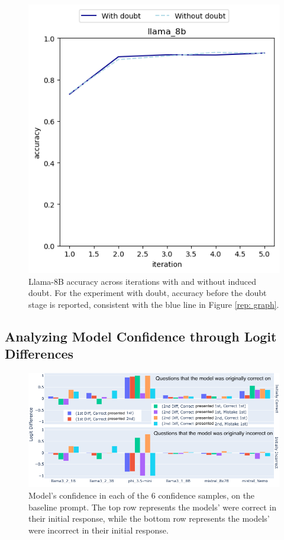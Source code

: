 \begin{figure}[ht!]
  \centering
  \includegraphics[width=0.7\columnwidth]{img/llama_8b_graph.png} %
  \caption{Llama-8B accuracy across iterations with and without induced doubt. For the experiment with doubt, accuracy before the doubt stage is reported, consistent with the blue line in Figure \ref{rep: graph}.}
  \label{rep: graph_8b}
\end{figure}

\subsection{Analyzing Model Confidence through Logit Differences}

\begin{figure}[htbp!]
  \centering
  \includegraphics[width=\textwidth]{img/model_confidence_by_initial_correctness_on_baseline.png}
  \caption{Model's confidence in each of the 6 confidence samples, on the baseline prompt. The top row represents the models' were correct in their initial response, while the bottom row represents the models' were incorrect in their initial response.}
  \label{fig:models_confidence_per_initial_correctness}
\end{figure}

